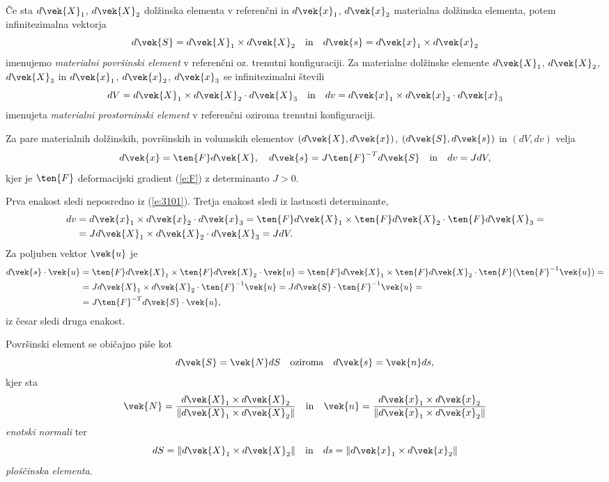 \begin{definicija}
	Če sta $d\vek{X}_1$, $d\vek{X}_2$ dolžinska elementa v referenčni
	in $d\vek{x}_1$, $d\vek{x}_2$ materialna dolžinska elementa,
	potem infinitezimalna vektorja
	\[ d\vek{S}= d\vek{X}_1\times d\vek{X}_2\quad\mathrm{in}\quad d\vek{s}= d\vek{x}_1\times d\vek{x}_2 \]
	imenujemo \emph{materialni površinski element} v referenčni oz. trenutni konfiguraciji.
	Za materialne dolžinske elemente $d\vek{X}_1$, $d\vek{X}_2$, $d\vek{X}_3$
	in $d\vek{x}_1$, $d\vek{x}_2$, $d\vek{x}_3$ se infinitezimalni števili
	\[ dV= d\vek{X}_1\times d\vek{X}_2\cdot d\vek{X}_3\quad\mathrm{in}\quad dv= d\vek{x}_1\times d\vek{x}_2\cdot d\vek{x}_3 \]
	imenujeta \emph{materialni prostorninski element} v referenčni oziroma trenutni konfiguraciji.
\end{definicija}
\begin{trditev}
	Za pare materialnih dolžinskih, površinskih in volumskih elementov $(d\vek{X},d\vek{x})$, $(d\vek{S},d\vek{s})$ in $(dV,dv)$ velja
	\begin{equation}\label{e:dxdX}
		d\vek{x}=\ten{F}d\vek{X},\quad d\vek{s}=J\ten{F}^{-T}d\vek{S}\quad\mathrm{in}\quad
		dv=JdV,
	\end{equation}
	kjer je $\ten{F}$ deformacijski gradient (\ref{e:F}) z determinanto $J>0$.
\end{trditev}
\proof
	Prva enakost sledi neposredno iz (\ref{e:3101}). Tretja enakost sledi iz lastnosti determinante,
	\begin{align*}
		dv&=d\vek{x}_1\times d\vek{x}_2\cdot d\vek{x}_3=
		\ten{F}d\vek{X}_1\times \ten{F}d\vek{X}_2\cdot \ten{F}d\vek{X}_3=\\
		&=Jd\vek{X}_1\times d\vek{X}_2\cdot d\vek{X}_3 = JdV.
	\end{align*}
	Za poljuben vektor $\vek{u}$ je
	\begin{align*}
		d\vek{s}\cdot\vek{u}&=\ten{F}d\vek{X}_1\times\ten{F}d\vek{X}_2\cdot\vek{u}=
		\ten{F}d\vek{X}_1\times\ten{F}d\vek{X}_2\cdot\ten{F}(\ten{F}^{-1}\vek{u})=\\
		&=J d\vek{X}_1\times d\vek{X}_2 \cdot \ten{F}^{-1}\vek{u} =J d\vek{S}\cdot\ten{F}^{-1}\vek{u}=\\
		&=J\ten{F}^{-T}d\vek{S}\cdot\vek{u},
	\end{align*}
	iz česar sledi druga enakost. 
\endproof

Površinski element se običajno piše kot
\[ d\vek{S}=\vek{N}dS \quad\mathrm{oziroma}\quad d\vek{s}=\vek{n}ds, \]
kjer sta
\[
	\vek{N}=\frac{d\vek{X}_1\times d\vek{X}_2}{\|d\vek{X}_1\times d\vek{X}_2\|} \quad\mathrm{in}\quad
	\vek{n}=\frac{d\vek{x}_1\times d\vek{x}_2}{\|d\vek{x}_1\times d\vek{x}_2\|}
\]
\emph{enotski normali} ter
\[ dS=\|d\vek{X}_1\times d\vek{X}_2\| \quad\mathrm{in}\quad ds=\|d\vek{x}_1\times d\vek{x}_2\| \]
\emph{ploščinska elementa}.


